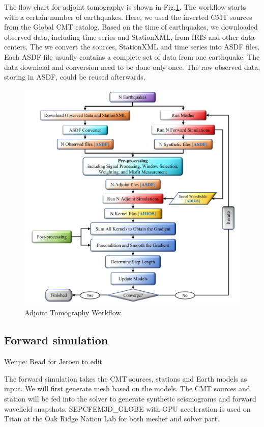 \documentclass[extra,mreferee]{gji}
\begin{document}
The flow chart for adjoint tomography is shown in Fig.\ref{fig:adjoint_workflow}.
The workflow starts with a certain number of earthquakes. Here, we used the
inverted CMT sources from the Global CMT catalog. Based on the time
of earthquakes, we downloaded observed data, including time series and StationXML,
from IRIS and other data centers. The we convert the sources, StationXML and time series
into ASDF files. Each ASDF file usually contains a complete set of data from one
earthquake. The data download and conversion need to be done only once. The raw observed data,
storing in ASDF, could be reused afterwards.

\begin{figure}
  \centering
  \includegraphics[width=\textwidth]{figures/adjoint_workflow_6.pdf}
  \caption{Adjoint Tomography Workflow.}
  \label{fig:adjoint_workflow}
\end{figure}

\subsection{Forward simulation}

{\color{Red} Wenjie: Read for Jeroen to edit}

The forward simulation takes the CMT sources, stations and Earth models as input.
We will first generate mesh based on the models. The CMT sources and station will
be fed into the solver to generate synthetic seismograms and forward wavefield snapshots.
SEPCFEM3D\_GLOBE with GPU acceleration is used on Titan at the Oak Ridge Nation Lab for
both mesher and solver part.
\end{document}
